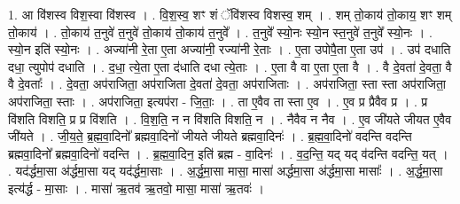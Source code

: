 \documentclass[17pt]{extarticle}
\begin{document}
1. आ वि॑शस्व विश॒स्वा वि॑शस्व । . वि॒श॒स्व॒ शꣳ शं ॅवि॑शस्व विशस्व॒ शम् । . शम् तो॒काय॑ तो॒काय॒ शꣳ शम् तो॒काय॑ । . तो॒काय॑ त॒नुवे॑ त॒नुवे॑ तो॒काय॑ तो॒काय॑ त॒नुवे᳚ । . त॒नुवे᳚ स्यो॒नः स्यो॒न स्त॒नुवे॑ त॒नुवे᳚ स्यो॒नः । . स्यो॒न इति॑ स्यो॒नः । . अज्या॑नी रे॒ता ए॒ता अज्या॑नी॒ रज्या॑नी रे॒ताः । . ए॒ता उपोपै॒ता ए॒ता उप॑ । . उप॑ दधाति दधा॒ त्युपोप॑ दधाति । . द॒धा॒ त्ये॒ता ए॒ता द॑धाति दधा त्ये॒ताः । . ए॒ता वै वा ए॒ता ए॒ता वै । . वै दे॒वता॑ दे॒वता॒ वै वै दे॒वताः᳚ । . दे॒वता॒ अप॑राजिता॒ अप॑राजिता दे॒वता॑ दे॒वता॒ अप॑राजिताः । . अप॑राजिता॒ स्ता स्ता अप॑राजिता॒ अप॑राजिता॒ स्ताः । . अप॑राजिता॒ इत्यप॑रा - जि॒ताः॒ । . ता ए॒वैव ता स्ता ए॒व । . ए॒व प्र प्रैवैव प्र । . प्र वि॑शति विशति॒ प्र प्र वि॑शति । . वि॒श॒ति॒ न न वि॑शति विशति॒ न । . नैवैव न नैव । . ए॒व जी॑यते जीयत ए॒वैव जी॑यते । . जी॒य॒ते॒ ब्र॒ह्म॒वा॒दिनो᳚ ब्रह्मवा॒दिनो॑ जीयते जीयते ब्रह्मवा॒दिनः॑ । . ब्र॒ह्म॒वा॒दिनो॑ वदन्ति वदन्ति ब्रह्मवा॒दिनो᳚ ब्रह्मवा॒दिनो॑ वदन्ति । . ब्र॒ह्म॒वा॒दिन॒ इति॑ ब्रह्म - वा॒दिनः॑ । . व॒द॒न्ति॒ यद् यद् व॑दन्ति वदन्ति॒ यत् । . यद॑र्द्धमा॒सा अ॑र्द्धमा॒सा यद् यद॑र्द्धमा॒साः । . अ॒र्द्ध॒मा॒सा मासा॒ मासा॑ अर्द्धमा॒सा अ॑र्द्धमा॒सा मासाः᳚ । . अ॒र्द्ध॒मा॒सा इत्य॑र्द्ध - मा॒साः । . मासा॑ ऋ॒तव॑ ऋ॒तवो॒ मासा॒ मासा॑ ऋ॒तवः॑ । \newline
\end{document}
